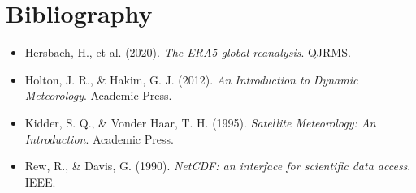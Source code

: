 \section*{Bibliography}
\begin{itemize}
    \item Hersbach, H., et al. (2020). \textit{The ERA5 global reanalysis}. QJRMS.
    \item Holton, J. R., \& Hakim, G. J. (2012). \textit{An Introduction to Dynamic Meteorology}. Academic Press.
    \item Kidder, S. Q., \& Vonder Haar, T. H. (1995). \textit{Satellite Meteorology: An Introduction}. Academic Press.
    \item Rew, R., \& Davis, G. (1990). \textit{NetCDF: an interface for scientific data access}. IEEE.
\end{itemize}
